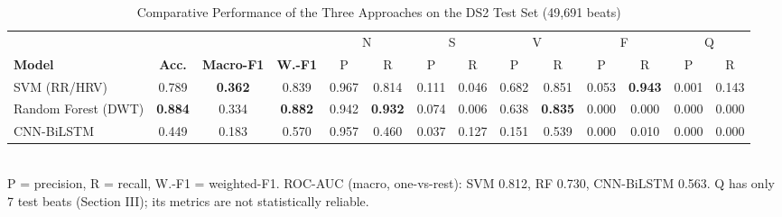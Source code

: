 \begin{table}[t]
\caption{Comparative Performance of the Three Approaches on the DS2 Test Set (49{,}691 beats)}
\label{tab:performance}
\centering
\footnotesize
\begin{tabular}{lccccccccccccc}
\toprule
& & & & \multicolumn{2}{c}{N} & \multicolumn{2}{c}{S} & \multicolumn{2}{c}{V} & \multicolumn{2}{c}{F} & \multicolumn{2}{c}{Q} \\
\cmidrule(lr){5-6}\cmidrule(lr){7-8}\cmidrule(lr){9-10}\cmidrule(lr){11-12}\cmidrule(lr){13-14}
\textbf{Model} & \textbf{Acc.} & \textbf{Macro-F1} & \textbf{W.-F1} & P & R & P & R & P & R & P & R & P & R \\
\midrule
SVM (RR/HRV)         & 0.789 & \textbf{0.362} & 0.839 & 0.967 & 0.814 & 0.111 & 0.046 & 0.682 & 0.851 & 0.053 & \textbf{0.943} & 0.001 & 0.143 \\
Random Forest (DWT)  & \textbf{0.884} & 0.334 & \textbf{0.882} & 0.942 & \textbf{0.932} & 0.074 & 0.006 & 0.638 & \textbf{0.835} & 0.000 & 0.000 & 0.000 & 0.000 \\
CNN-BiLSTM            & 0.449 & 0.183 & 0.570 & 0.957 & 0.460 & 0.037 & 0.127 & 0.151 & 0.539 & 0.000 & 0.010 & 0.000 & 0.000 \\
\bottomrule
\end{tabular}
\\[4pt]
\footnotesize P = precision, R = recall, W.-F1 = weighted-F1. ROC-AUC
(macro, one-vs-rest): SVM 0.812, RF 0.730, CNN-BiLSTM 0.563. Q has only 7
test beats (Section III); its metrics are not statistically reliable.
\end{table}
